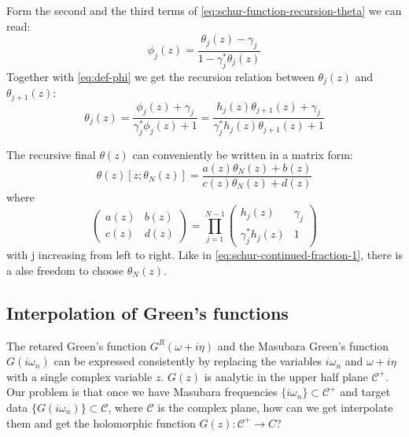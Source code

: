 \documentclass[
	preprint,%
	aps,
	prb,
	showpacs,	
	amsmath, amssymb]{revtex4-2}
\newcommand{\C}{ {\mathcal{C}} }
\begin{document}
Form the second and the third terms of \cref{eq:schur-function-recursion-theta}
we can read:
\begin{equation}\label{eq:phi-theta-j}
	\phi_j(z)
	= \frac{\theta_j(z) - \gamma_j}{1 - \gamma_j^* \theta_j(z)}
\end{equation}
Together with \cref{eq:def-phi} we get the recursion relation between 
$\theta_j(z)$ and $\theta_{j+1}(z)$:
\begin{equation}\label{eq:recursion-relation-theta}
	\theta_j(z) = \frac{\phi_j(z) + \gamma_j}{\gamma_j^*\phi_j(z)+1}
		= \frac{h_j(z) \theta_{j+1}(z)  + \gamma_j}
			{\gamma_j^*h_j(z) \theta_{j+1}(z) +1}
\end{equation}

The recursive final $\theta(z)$ can conveniently be written in a
matrix form:
\begin{equation}\label{eq:recursive-theta}
	\theta(z)[z;\theta_N(z)] 
		= \frac{a(z)\theta_N(z) + b(z)}{c(z)\theta_N(z) + d(z)}
\end{equation}
where
\begin{equation}\label{eq:factor-matrix}
	\left(
		\begin{matrix}
			a(z) & b(z) \\
			c(z) & d(z)
		\end{matrix}
	\right) = \prod_{j=1}^{N-1}
	\left(
		\begin{matrix}
			h_j(z)            & \gamma_j \\
			\gamma_j^* h_j(z) & 1
		\end{matrix}
	\right)
\end{equation}
with j increasing from left to right. Like in \cref{eq:schur-continued-fraction-1}, 
there is a alse freedom to choose $\theta_N(z)$.


\subsection{Interpolation of Green's functions}
\label{subsec:interpolation-of-GF}

The retared Green's function $G^R(\omega + i\eta)$ and the Masubara 
Green's function $G(i\omega_n)$ can be expressed consistently by replacing 
the variables $i\omega_n$ and $\omega + i\eta$ with a single complex 
variable $z$. $G(z)$ is analytic in the upper half plane $\C^+$. 
Our problem is that once we have Masubara frequencies 
$\{i\omega_n\} \subset \C^+$ 
and target data $\{ G(i\omega_n)\} \subset  \C$, where $\C$ is 
the complex plane, how can we get interpolate them and get the 
holomorphic function $G(z):\C^+ \to C$?
\end{document}
